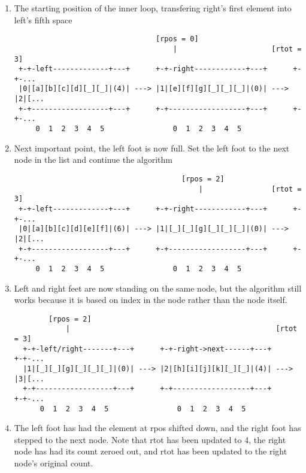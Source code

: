 \begin{enumerate}

	\item The starting position of the inner loop, transfering right's first
	      element into left's fifth space

	      \begin{verbatim}
                                 [rpos = 0]                           
                                     |                      [rtot = 3]
 +-+-left-------------+---+      +-+-right------------+---+      +-+-...
 |0|[a][b][c][d][_][_]|(4)| ---> |1|[e][f][g][_][_][_]|(0)| ---> |2|[...
 +-+------------------+---+      +-+------------------+---+      +-+-...
     0  1  2  3  4  5                0  1  2  3  4  5                 					
			 \end{verbatim}


	\item Next important point, the left foot is now full. Set the left foot
	      to the next node in the list and continue the algorithm
	      \begin{verbatim}
                                       [rpos = 2]                     
                                           |                [rtot = 3]
 +-+-left-------------+---+      +-+-right------------+---+      +-+-...
 |0|[a][b][c][d][e][f]|(6)| ---> |1|[_][_][g][_][_][_]|(0)| ---> |2|[... 
 +-+------------------+---+      +-+------------------+---+      +-+-...				
     0  1  2  3  4  5                0  1  2  3  4  5                 				
			 \end{verbatim}


	\item Left and right feet are now standing on the same node, but the
	      algorithm still works because it is based on index in the node
	      rather than the node itself.
	      \begin{verbatim}
        [rpos = 2]                                                     
            |                                                [rtot = 3]
  +-+-left/right-------+---+      +-+-right->next------+---+      +-+-... 
  |1|[_][_][g][_][_][_]|(0)| ---> |2|[h][i][j][k][_][_]|(4)| ---> |3|[... 					
  +-+------------------+---+      +-+------------------+---+      +-+-...					
      0  1  2  3  4  5                0  1  2  3  4  5                 				
		\end{verbatim}


	\item The left foot has had the element at rpos shifted down, and the
	      right foot has stepped to the next node. Note that rtot has been
	      updated to 4, the right node has had its count zeroed out, and
	      rtot has been updated to the right node's original count.



\end{enumerate}
